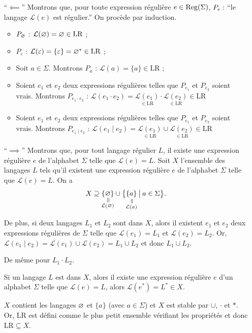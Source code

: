 \begin{prv}
	\begin{itemize}
		\item[``$\impliedby$\/'']
			Montrons que, pour toute expression régulière $e \in \operatorname{Reg}(\Sigma)$, $P_e : \hbox{}$\/``le langage $\mathcal{L}(e)$\/ est régulier.''
			On procède par induction.
			\begin{itemize}
				\item $P_\varnothing$\/ : $\mathcal{L}(\varnothing) = \varnothing \in \mathrm{LR}$\/ ;
				\item $P_{\varepsilon}$\/ : $\mathcal{L}(\varepsilon) = \{\varepsilon\} = \varnothing^* \in \mathrm{LR}$\/ ;
				\item Soit $a \in \Sigma$. Montrons $P_a$\/ : $\mathcal{L}(a) = \{a\} \in \mathrm{LR}$\/ ;
				\item Soient $e_1$\/ et $e_2$\/ deux expressions régulières telles que $P_{e_1}$\/ et $P_{e_2}$\/ soient vrais. Montrons $P_{e_1 \cdot e_2}$\/ : $\mathcal{L}(e_1 \cdot e_2) = \underset{\in \mathrm{LR}}{\mathcal{L}(e_1)} \cdot \underset{\in \mathrm{LR}}{\mathcal{L}(e_2)} \in \mathrm{LR}$\/
				\item Soient $e_1$\/ et $e_2$\/ deux expressions régulières telles que $P_{e_1}$\/ et $P_{e_2}$\/ soient vrais. Montrons $P_{e_1 \mid e_2}$\/ : $\mathcal{L}(e_1 \mid e_2) = \underset{\in \mathrm{LR}}{\mathcal{L}(e_1)} \cup \underset{\in \mathrm{LR}}{\mathcal{L}(e_2)} \in \mathrm{LR}$\/
			\end{itemize}
		\item[``$\implies$\/''] Montrons que, pour tout langage régulier $L$, il existe une expression régulière $e$\/ de l'alphabet $\Sigma$\/ telle que $\mathcal{L}(e) = L$. 
			Soit $X$\/ l'ensemble des langages $L$\/ tels qu'il existent une expression régulière $e$\/ de l'alphabet $\Sigma$\/ telle que $\mathcal{L}(e) = L$. On a \[
				X \supseteq \{ \underset{\mathclap{\substack{\vrt=\\\mathcal{L}(\O)}}}{\O} \} \cup \big\{ \underset{\mathclap{\substack{\vrt=\\\mathcal{L}(a)}}}{\{a\}} \:\big|\: a \in \Sigma \big\}
			.\]

			De plus, si deux langages $L_1$\/ et $L_2$\/ sont dans $X$, alors il existent $e_1$\/ et $e_2$\/ deux expressions régulières de $\Sigma$\/ telle que $\mathcal{L}(e_1) = L_1$\/ et $\mathcal{L}(e_2) = L_2$. Or, $\mathcal{L}(e_1  \mid e_2) = \mathcal{L}(e_1) \cup \mathcal{L}(e_2) = L_1 \cup L_2$\/ et donc $L_1 \cup L_2$.

			De même pour $L_1\cdot L_2$.

			Si un langage $L$\/ est dans $X$, alors il existe une expression régulière $e$\/ d'un alphabet $\Sigma$\/ telle que $\mathcal{L}(e) = L$, alors $\mathcal{L}(e^*) = L^* \in X$.
			
			$X$\/ contient les langages $\varnothing$\/ et $\{a\}$\/ (avec $a \in \Sigma$) et $X$\/ est stable par $\cup $, $\cdot $\/ et $*$. Or, $\mathrm{LR}$\/ est défini comme le plus petit ensemble vérifiant les propriétés et donc $\mathrm{LR} \subseteq X$.
	\end{itemize}
\end{prv}

